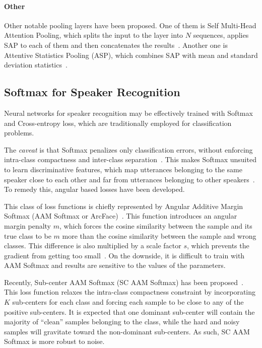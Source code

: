 \documentclass[conference]{IEEEtran}
\begin{document}
\paragraph{Other}Other notable pooling layers have been proposed. One of them is Self Multi-Head Attention Pooling, which splits the input to the layer into $N$ sequences, applies SAP to each of them and then concatenates the results~\cite{india2019selfmha}. Another one is Attentive Statistics Pooling (ASP), which combines SAP with mean and standard deviation statistics~\cite{okabe2018asp}.

\subsection{Softmax for Speaker Recognition}

Neural networks for speaker recognition may be effectively trained with Softmax and Cross-entropy loss, which are traditionally employed for classification problems. 

The \textit{caveat} is that Softmax penalizes only classification errors, without enforcing intra-class compactness and inter-class separation~\cite{chung2020defence}. This makes Softmax unsuited to learn discriminative features, which map utterances belonging to the same speaker close to each other and far from utterances belonging to other speakers~\cite{liu2019large}. To remedy this, angular based losses have been developed.


This class of loss functions is chiefly represented by Angular Additive Margin Softmax (AAM Softmax or ArcFace)~\cite{deng2019arcface}. This function introduces an angular margin penalty $m$, which forces the cosine similarity between the sample and its true class to be $m$ more than the cosine similarity between the sample and wrong classes. This difference is also multiplied by a scale factor $s$, which prevents the gradient from getting too small~\cite{chung2020defence,hajibabaei2018unified}. On the downside, it is difficult to train with AAM Softmax and results are sensitive to the values of the parameters.

Recently, Sub-center AAM Softmax (SC AAM Softmax) has been proposed~\cite{deng2020subarcface}. This loss function relaxes the intra-class compactness constraint by incorporating $K$ sub-centers for each class and forcing each sample to be close to any of the positive sub-centers. It is expected that one dominant sub-center will contain the majority of ``clean'' samples belonging to the class, while the hard and noisy samples will gravitate toward the non-dominant sub-centers. As such, SC AAM Softmax is more robust to noise.
\end{document}
